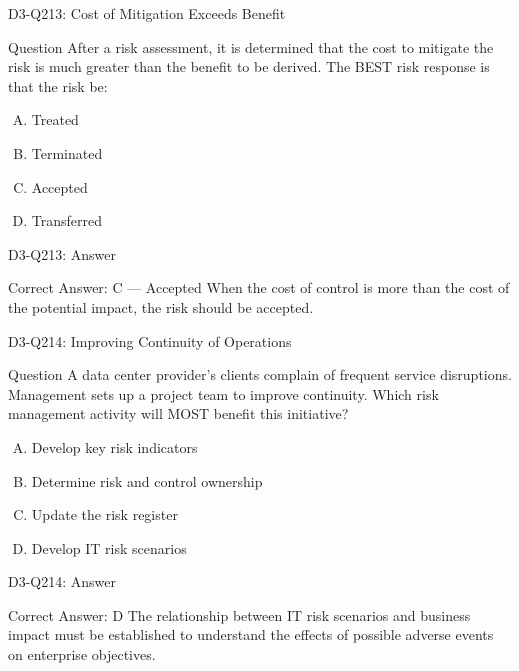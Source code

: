 \documentclass{beamer}
\begin{document}
	\begin{frame}{D3-Q213: Cost of Mitigation Exceeds Benefit}
		\begin{block}{Question}
			After a risk assessment, it is determined that the cost to mitigate the risk is much greater than the benefit to be derived. The BEST risk response is that the risk be:
		\end{block}
		\begin{enumerate}[(A)]
			\item Treated
			\item Terminated
			\item Accepted
			\item Transferred
		\end{enumerate}
	\end{frame}
	\begin{frame}{D3-Q213: Answer}
		\begin{block}{Correct Answer: C --- Accepted}
			When the cost of control is more than the cost of the potential impact, the risk should be accepted.
		\end{block}
	\end{frame}
	
	\begin{frame}{D3-Q214: Improving Continuity of Operations}
		\begin{block}{Question}
			A data center provider's clients complain of frequent service disruptions. Management sets up a project team to improve continuity. Which risk management activity will MOST benefit this initiative?
		\end{block}
		\begin{enumerate}[(A)]
			\item Develop key risk indicators
			\item Determine risk and control ownership
			\item Update the risk register
			\item Develop IT risk scenarios
		\end{enumerate}
	\end{frame}
	\begin{frame}{D3-Q214: Answer}
		\begin{block}{Correct Answer: D}
			The relationship between IT risk scenarios and business impact must be established to understand the effects of possible adverse events on enterprise objectives.
		\end{block}
	\end{frame}
	
\end{document}
